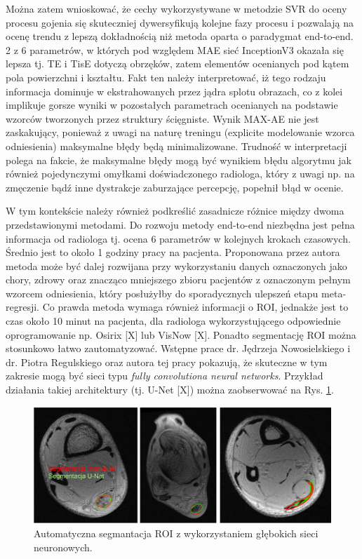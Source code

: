 Można zatem wnioskować, że cechy wykorzystywane w metodzie SVR do oceny procesu gojenia się skuteczniej dywersyfikują kolejne fazy procesu i pozwalają na ocenę trendu z lepszą dokładnością niż metoda oparta o paradygmat end-to-end. 2 z 6 parametrów, w których pod względem MAE sieć InceptionV3 okazała się lepsza tj. TE i TisE dotyczą obrzęków, zatem elementów ocenianych pod kątem pola powierzchni i kształtu. Fakt ten należy interpretować, iż tego rodzaju informacja dominuje w ekstrahowanych przez jądra splotu obrazach, co z kolei implikuje gorsze wyniki w pozostałych parametrach ocenianych na podstawie wzorców tworzonych przez struktury ścięgniste. Wynik MAX-AE nie jest zaskakujący, ponieważ z uwagi na naturę treningu (explicite modelowanie wzorca odniesienia) maksymalne błędy będą minimalizowane. Trudność w interpretacji polega na fakcie, że maksymalne błędy mogą być wynikiem błędu algorytmu jak również pojedynczymi omyłkami doświadczonego radiologa, który z uwagi np. na zmęczenie bądź inne dystrakcje zaburzające percepcję, popełnił błąd w ocenie.  

W tym kontekście należy również podkreślić zasadnicze różnice między dwoma przedstawionymi metodami. Do rozwoju metody end-to-end niezbędna jest pełna informacja od radiologa tj. ocena 6 parametrów w kolejnych krokach czasowych. Średnio jest to około 1 godziny pracy na pacjenta. Proponowana przez autora metoda może być dalej rozwijana przy wykorzystaniu danych oznaczonych jako chory, zdrowy oraz znacząco mniejszego zbioru pacjentów z oznaczonym pełnym wzorcem odniesienia, który posłużyłby do sporadycznych ulepszeń etapu meta-regresji. Co prawda metoda wymaga również informacji o ROI, jednakże jest to czas około 10 minut na pacjenta, dla radiologa wykorzystującego odpowiednie oprogramowanie np. Osirix [X] lub VisNow [X]. Ponadto segmentację ROI można stosunkowo łatwo zautomatyzować. Wstępne prace dr. Jędrzeja Nowosielskiego i dr. Piotra Regulskiego oraz autora tej pracy pokazują, że skuteczne w tym zakresie mogą być sieci typu \textit{fully convolutiona neural networks}. Przykład działania takiej architektury (tj. U-Net [X]) można zaobserwować na Rys. \ref{fig:segmentacja}. 

\begin{figure}[h]
	\centering
	\includegraphics[width=1\textwidth]{figures/Segmentacja.png}
	\caption{Automatyczna segmantacja ROI z wykorzystaniem głębokich sieci neuronowych.}\label{fig:segmentacja}
\end{figure}

